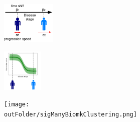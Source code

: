\begin{frame}
\begin{columns}[T]
\begin{column}{.7\textwidth}
    \end{column}
    \begin{column}{.3\textwidth}

    \vspace{-2em}
    
     \begin{figure}
    \centering
    \includegraphics[height=2cm]{disease_axis.png}
    \end{figure}
    
     \begin{figure}
    \centering
    \includegraphics[height=2cm, trim=120 0 120 0]{Disease_progression_one_sigmoid_confidence.png}
    \end{figure}
    
     \begin{figure}
    \centering
    \texttt{[image: \\outFolder/sigManyBiomkClustering.png]}
    \end{figure}

    \end{column}
  \end{columns}
  
% 
%   


\end{frame}






